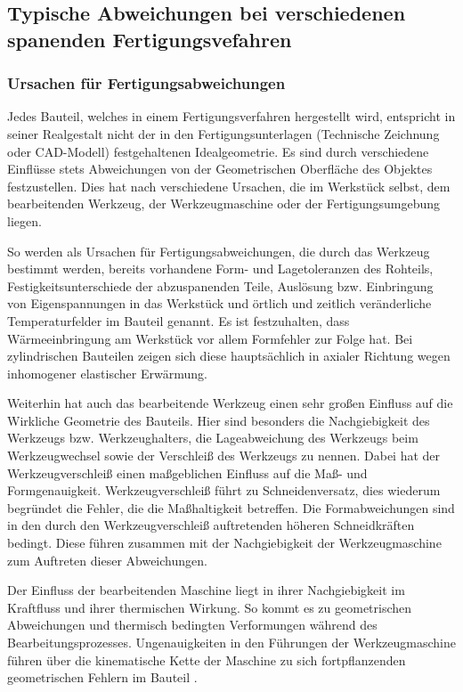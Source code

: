 \subsection{Typische Abweichungen bei verschiedenen spanenden Fertigungsvefahren}

\subsubsection{Ursachen für Fertigungsabweichungen}

Jedes Bauteil, welches in einem Fertigungsverfahren hergestellt wird, entspricht in seiner Realgestalt nicht der in den Fertigungsunterlagen (Technische Zeichnung oder CAD-Modell) festgehaltenen Idealgeometrie. Es sind durch verschiedene Einflüsse stets Abweichungen von der Geometrischen Oberfläche des Objektes festzustellen. Dies hat nach \cite{Denkena.2011} verschiedene Ursachen, die im Werkstück selbst, dem bearbeitenden Werkzeug, der Werkzeugmaschine oder der Fertigungsumgebung liegen. 

So werden als Ursachen für Fertigungsabweichungen, die durch das Werkzeug bestimmt werden, bereits vorhandene Form- und Lagetoleranzen des Rohteils, Festigkeitsunterschiede der abzuspanenden Teile, Auslösung bzw. Einbringung von Eigenspannungen in das Werkstück und örtlich und zeitlich veränderliche Temperaturfelder im Bauteil genannt.
Es ist festzuhalten, dass Wärmeeinbringung am Werkstück vor allem Formfehler zur Folge hat. Bei zylindrischen Bauteilen zeigen sich diese hauptsächlich in axialer Richtung wegen inhomogener elastischer Erwärmung.

Weiterhin hat auch das bearbeitende Werkzeug einen sehr großen Einfluss auf die Wirkliche Geometrie des Bauteils. Hier sind besonders die Nachgiebigkeit des Werkzeugs bzw. Werkzeughalters, die Lageabweichung des Werkzeugs beim Werkzeugwechsel sowie der Verschleiß des Werkzeugs zu nennen. Dabei hat der Werkzeugverschleiß einen maßgeblichen Einfluss auf die Maß- und Formgenauigkeit. Werkzeugverschleiß führt zu Schneidenversatz, dies wiederum begründet die Fehler, die die Maßhaltigkeit betreffen. Die Formabweichungen sind in den durch den Werkzeugverschleiß auftretenden höheren Schneidkräften bedingt. Diese führen zusammen mit der Nachgiebigkeit der Werkzeugmaschine zum Auftreten dieser Abweichungen.

Der Einfluss der bearbeitenden Maschine liegt in ihrer Nachgiebigkeit im Kraftfluss und ihrer thermischen Wirkung. So kommt es zu geometrischen Abweichungen und thermisch bedingten Verformungen während des Bearbeitungsprozesses. Ungenauigkeiten in den Führungen der Werkzeugmaschine führen über die kinematische Kette der Maschine zu sich fortpflanzenden geometrischen Fehlern im Bauteil \cite{Neugebauer.2012}.

